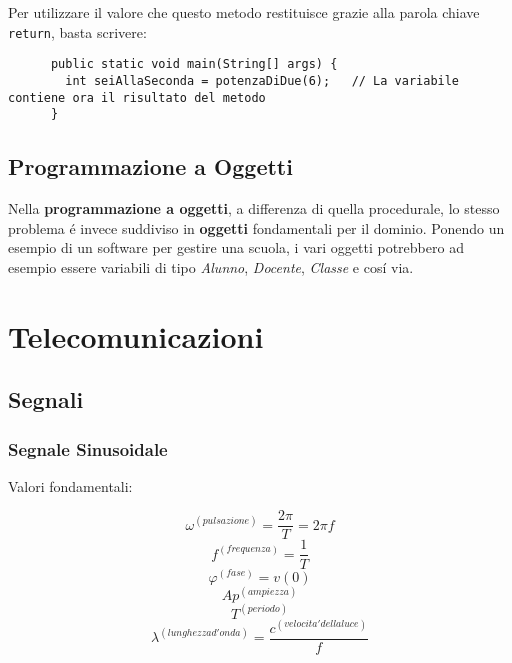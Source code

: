 \documentclass{article}
\begin{document}
{    Per utilizzare il valore che questo metodo restituisce grazie alla parola chiave \texttt{return}, basta scrivere:

    \begin{verbatim}
      public static void main(String[] args) {
        int seiAllaSeconda = potenzaDiDue(6);   // La variabile contiene ora il risultato del metodo
      }
    \end{verbatim}

    \subsection{Programmazione a Oggetti}
    Nella \textbf{programmazione a oggetti}, a differenza di quella procedurale, lo stesso problema é invece suddiviso in \textbf{oggetti} fondamentali per il dominio. Ponendo un esempio di un software per gestire una scuola, i vari oggetti potrebbero ad esempio essere variabili di tipo \textit{Alunno}, \textit{Docente}, \textit{Classe} e cosí via.
  }

  \section{Telecomunicazioni}
  {
    \subsection{Segnali}
    \subsubsection{Segnale Sinusoidale}


    Valori fondamentali:

    $$ \omega ^{(pulsazione)} = \frac{2\pi}{T} = 2\pi f $$
    $$ f ^{(frequenza)} = \frac{1}{T} $$
    $$ \varphi ^{(fase)} = v(0) $$
    $$ Ap ^{(ampiezza)} $$
    $$ T ^{(periodo)} $$
    $$ \lambda ^{(lunghezza d'onda)} = \frac{c ^{(velocita' della luce)}}{f} $$
  }
\end{document}

